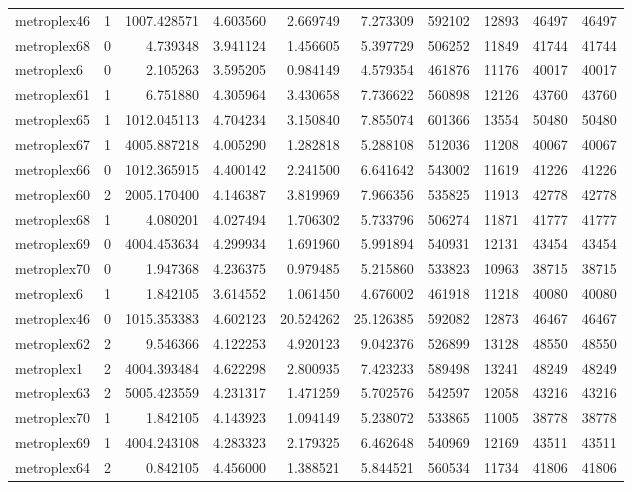 \begin{longtable}{|l|r|r|r|r|r|r|r|r|r|}
metroplex46 & 1 & 1007.428571 & 4.603560 & 2.669749 & 7.273309 & 592102 & 12893 & 46497 & 46497 \\
metroplex68 & 0 & 4.739348 & 3.941124 & 1.456605 & 5.397729 & 506252 & 11849 & 41744 & 41744 \\
metroplex6 & 0 & 2.105263 & 3.595205 & 0.984149 & 4.579354 & 461876 & 11176 & 40017 & 40017 \\
metroplex61 & 1 & 6.751880 & 4.305964 & 3.430658 & 7.736622 & 560898 & 12126 & 43760 & 43760 \\
metroplex65 & 1 & 1012.045113 & 4.704234 & 3.150840 & 7.855074 & 601366 & 13554 & 50480 & 50480 \\
metroplex67 & 1 & 4005.887218 & 4.005290 & 1.282818 & 5.288108 & 512036 & 11208 & 40067 & 40067 \\
metroplex66 & 0 & 1012.365915 & 4.400142 & 2.241500 & 6.641642 & 543002 & 11619 & 41226 & 41226 \\
metroplex60 & 2 & 2005.170400 & 4.146387 & 3.819969 & 7.966356 & 535825 & 11913 & 42778 & 42778 \\
metroplex68 & 1 & 4.080201 & 4.027494 & 1.706302 & 5.733796 & 506274 & 11871 & 41777 & 41777 \\
metroplex69 & 0 & 4004.453634 & 4.299934 & 1.691960 & 5.991894 & 540931 & 12131 & 43454 & 43454 \\
metroplex70 & 0 & 1.947368 & 4.236375 & 0.979485 & 5.215860 & 533823 & 10963 & 38715 & 38715 \\
metroplex6 & 1 & 1.842105 & 3.614552 & 1.061450 & 4.676002 & 461918 & 11218 & 40080 & 40080 \\
metroplex46 & 0 & 1015.353383 & 4.602123 & 20.524262 & 25.126385 & 592082 & 12873 & 46467 & 46467 \\
metroplex62 & 2 & 9.546366 & 4.122253 & 4.920123 & 9.042376 & 526899 & 13128 & 48550 & 48550 \\
metroplex1 & 2 & 4004.393484 & 4.622298 & 2.800935 & 7.423233 & 589498 & 13241 & 48249 & 48249 \\
metroplex63 & 2 & 5005.423559 & 4.231317 & 1.471259 & 5.702576 & 542597 & 12058 & 43216 & 43216 \\
metroplex70 & 1 & 1.842105 & 4.143923 & 1.094149 & 5.238072 & 533865 & 11005 & 38778 & 38778 \\
metroplex69 & 1 & 4004.243108 & 4.283323 & 2.179325 & 6.462648 & 540969 & 12169 & 43511 & 43511 \\
metroplex64 & 2 & 0.842105 & 4.456000 & 1.388521 & 5.844521 & 560534 & 11734 & 41806 & 41806 \\

\end{longtable}
